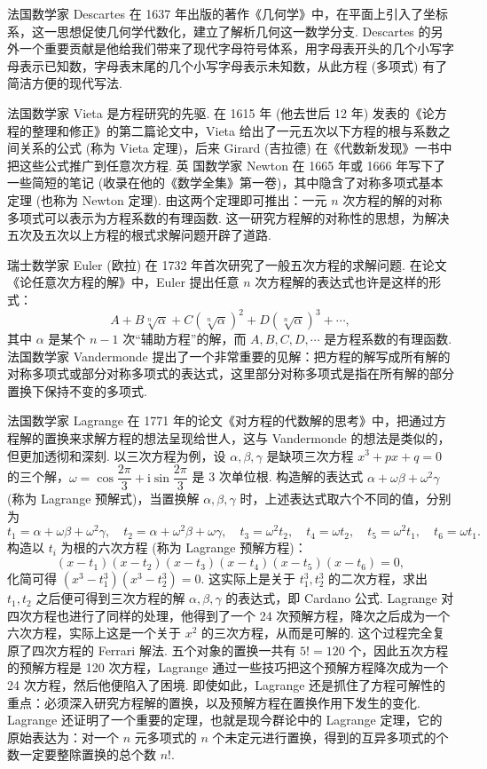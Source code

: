 \documentclass[UTF8,12pt,a4paper,fontset=fandol]{ctexart}
\begin{document}
法国数学家 Descartes 在 1637 年出版的著作《几何学》中，在平面上引入了坐标系，这一思想促使几何学代数化，建立了解析几何这一数学分支. Descartes 的另外一个重要贡献是他给我们带来了现代字母符号体系，用字母表开头的几个小写字母表示已知数，字母表末尾的几个小写字母表示未知数，从此方程 (多项式) 有了简洁方便的现代写法.

法国数学家 Vieta 是方程研究的先驱. 在 1615 年 (他去世后 12 年) 发表的《论方程的整理和修正》的第二篇论文中，Vieta 给出了一元五次以下方程的根与系数之间关系的公式 (称为 Vieta 定理)，后来 Girard (吉拉德) 在《代数新发现》一书中把这些公式推广到任意次方程. 英
国数学家 Newton 在 1665 年或 1666 年写下了一些简短的笔记 (收录在他的《数学全集》第一卷)，其中隐含了对称多项式基本定理 (也称为 Newton 定理). 由这两个定理即可推出：一元 $n$ 次方程的解的对称多项式可以表示为方程系数的有理函数. 这一研究方程解的对称性的思想，为解决五次及五次以上方程的根式求解问题开辟了道路.

瑞士数学家 Euler (欧拉) 在 1732 年首次研究了一般五次方程的求解问题. 在论文《论任意次方程的解》中，Euler 提出任意 $n$ 次方程解的表达式也许是这样的形式：
\[
A+B\sqrt[n]{\alpha}+C(\sqrt[n]{\alpha})^2+D(\sqrt[n]{\alpha})^3+\cdots,
\]
其中 $\alpha$ 是某个 $n-1$ 次“辅助方程”的解，而 $A,B,C,D,\cdots$ 是方程系数的有理函数. 法国数学家 Vandermonde 提出了一个非常重要的见解：把方程的解写成所有解的对称多项式或部分对称多项式的表达式，这里部分对称多项式是指在所有解的部分置换下保持不变的多项式.

法国数学家 Lagrange 在 1771 年的论文《对方程的代数解的思考》中，把通过方程解的置换来求解方程的想法呈现给世人，这与 Vandermonde 的想法是类似的，但更加透彻和深刻. 以三次方程为例，设 $\alpha,\beta,\gamma$ 是缺项三次方程 $x^3+px+q=0$ 的三个解，$\omega=\cos\dfrac{2\pi}{3}+\mathrm{i}\sin\dfrac{2\pi}{3}$ 是 3 次单位根. 构造解的表达式 $\alpha+\omega\beta+\omega^2\gamma$ (称为 Lagrange 预解式)，当置换解 $\alpha,\beta,\gamma$ 时，上述表达式取六个不同的值，分别为
\[
t_1=\alpha+\omega\beta+\omega^2\gamma,\quad
t_2=\alpha+\omega^2\beta+\omega\gamma,\quad
t_3=\omega^2t_2,\quad
t_4=\omega t_2,\quad
t_5=\omega^2t_1,\quad
t_6=\omega t_1.
\]
构造以 $t_i$ 为根的六次方程 (称为 Lagrange 预解方程)：
\[
(x-t_1)(x-t_2)(x-t_3)(x-t_4)(x-t_5)(x-t_6)=0,
\]
化简可得 $(x^3-t_1^3)(x^3-t_2^3)=0$. 这实际上是关于 $t_1^3,t_2^3$ 的二次方程，求出 $t_1,t_2$ 之后便可得到三次方程的解 $\alpha,\beta,\gamma$ 的表达式，即 Cardano 公式. Lagrange 对四次方程也进行了同样的处理，他得到了一个 24 次预解方程，降次之后成为一个六次方程，实际上这是一个关于 $x^2$ 的三次方程，从而是可解的. 这个过程完全复原了四次方程的 Ferrari 解法. 五个对象的置换一共有 $5!=120$ 个，因此五次方程的预解方程是 120 次方程，Lagrange 通过一些技巧把这个预解方程降次成为一个 24 次方程，然后他便陷入了困境. 即使如此，Lagrange 还是抓住了方程可解性的重点：必须深入研究方程解的置换，以及预解方程在置换作用下发生的变化. Lagrange 还证明了一个重要的定理，也就是现今群论中的 Lagrange 定理，它的原始表达为：对一个 $n$ 元多项式的 $n$ 个未定元进行置换，得到的互异多项式的个数一定要整除置换的总个数 $n!$.
\end{document}
